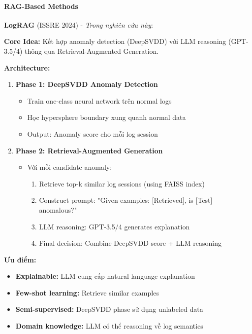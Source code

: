 \paragraph{RAG-Based Methods}

\textbf{LogRAG} \cite{jiang2024lograg} (ISSRE 2024) - \textit{Trong nghiên cứu này}:

\textbf{Core Idea:} Kết hợp anomaly detection (DeepSVDD) với LLM reasoning (GPT-3.5/4) thông qua Retrieval-Augmented Generation.

\textbf{Architecture:}
\begin{enumerate}
    \item \textbf{Phase 1: DeepSVDD Anomaly Detection}
    \begin{itemize}
        \item Train one-class neural network trên normal logs
        \item Học hypersphere boundary xung quanh normal data
        \item Output: Anomaly score cho mỗi log session
    \end{itemize}
    
    \item \textbf{Phase 2: Retrieval-Augmented Generation}
    \begin{itemize}
        \item Với mỗi candidate anomaly:
        \begin{enumerate}
            \item Retrieve top-k similar log sessions (using FAISS index)
            \item Construct prompt: "Given examples: [Retrieved], is [Test] anomalous?"
            \item LLM reasoning: GPT-3.5/4 generates explanation
            \item Final decision: Combine DeepSVDD score + LLM reasoning
        \end{enumerate}
    \end{itemize}
\end{enumerate}

\textbf{Ưu điểm:}
\begin{itemize}
    \item \textbf{Explainable:} LLM cung cấp natural language explanation
    \item \textbf{Few-shot learning:} Retrieve similar examples
    \item \textbf{Semi-supervised:} DeepSVDD phase sử dụng unlabeled data
    \item \textbf{Domain knowledge:} LLM có thể reasoning về log semantics
\end{itemize}

